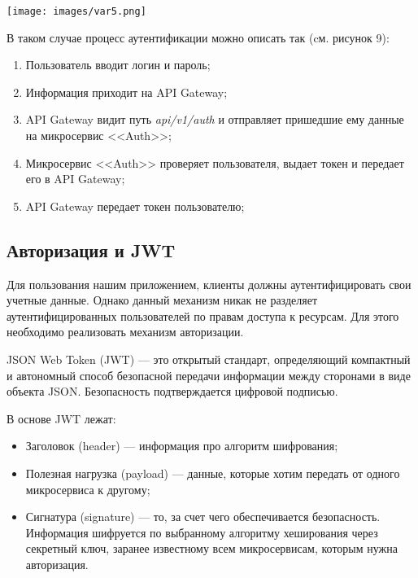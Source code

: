         
   

    \noindent\begin{minipage}[t]{\textwidth}
                 \begin{center}
                 \texttt{[image: images/var5.png]}
                 \end{center} \label{fig:Moreno}
            
            \end{minipage}

             В таком случае процесс аутентификации можно описать так (cм. рисунок 9): 
    \begin{enumerate}
        \item Пользователь вводит логин и пароль;
        \item Информация приходит на API Gateway;
        \item API Gateway видит путь \textit{api/v1/auth} и отправляет пришедшие ему данные на микросервис <<Auth>>;
        \item Микросервис <<Auth>> проверяет пользователя, выдает токен и передает его в API Gateway;
        \item API Gateway передает токен пользователю;
        
    \end{enumerate}


    \subsection{Авторизация и JWT}

    Для пользования нашим приложением, клиенты должны аутентифицировать свои учетные данные. Однако данный механизм никак не разделяет аутентифицированных пользователей по правам доступа к ресурсам. Для этого необходимо реализовать механизм авторизации.

    JSON Web Token (JWT) — это открытый стандарт, определяющий компактный и автономный способ безопасной передачи информации между сторонами в виде объекта JSON. Безопасность подтверждается цифровой подписью. \cite{jwt}

    В основе JWT лежат:

    \begin{itemize}
        \item Заголовок (header) — информация про алгоритм шифрования;
         \item Полезная нагрузка (payload) — данные, которые хотим передать от одного микросервиса к другому; 
        \item Сигнатура (signature) — то, за счет чего обеспечивается безопасность. Информация шифруется по выбранному алгоритму хеширования через секретный ключ, заранее известному всем микросервисам, которым нужна авторизация.
    \end{itemize}

